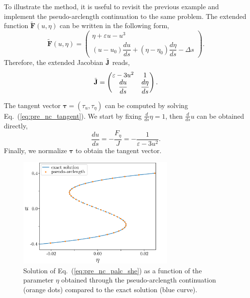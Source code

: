 \begin{exmp}
    To illustrate the method, it is useful to revisit the previous example and implement the pseudo-arclength continuation
    to the same problem. The extended function $\tilde{\bm{F}}(u, {\eta})$ can be written
    in the following form,
    \begin{equation}
        \tilde{\bm{F}}(u, \eta) = 
            \begin{pmatrix}
                \eta + \varepsilon u - u^3 \\
                \left(u - u_0\right) \dfrac{du}{ds} + (\eta - \eta_0) \dfrac{d\eta}{ds} - \Delta s
            \end{pmatrix}.
            \label{eq:pre_nc_palc_she}
    \end{equation}
    Therefore, the extended Jacobian $\tilde{\mathbf{J}}$ reads,
    \begin{equation*}
        \tilde{\mathbf{J}} = \begin{pmatrix}
                \varepsilon - 3u^2 & 1 \\
                \dfrac{du}{ds} & \dfrac{d\eta}{ds}
            \end{pmatrix}.
    \end{equation*}

    The tangent vector $\bm{\tau} = (\tau_u, \tau_{\eta})$ can be computed by solving Eq.~(\ref{eq:pre_nc_tangent}).
    We start by fixing $\frac{d}{ds}\eta = 1$, then $\frac{d}{ds}u$ can be obtained directly,
    \begin{equation*}
        \dfrac{du}{ds} = -\dfrac{F_{\eta}}{J} = -\dfrac{1}{\varepsilon - 3u^2}.
    \end{equation*}
    Finally, we normalize $\bm{\tau}$ to obtain the tangent vector.

    \begin{figure}[h]
        \centering
        \includegraphics[width=0.7\textwidth]{scripts/figures/palc_she.png}
        \caption[short]{Solution of Eq.~(\ref{eq:pre_nc_palc_she}) as a function of the parameter $\eta$ obtained
        through the pseudo-arclength continuation (orange dots) compared to the exact solution (blue curve).}
        \label{fig:pre_palc_she}
    \end{figure}

\end{exmp}

